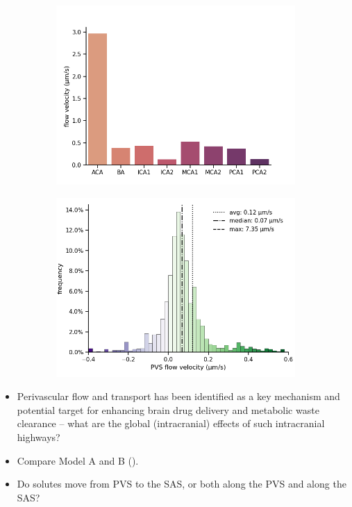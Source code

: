 \documentclass[fleqn,10pt]{wlscirep}
\begin{document}
\begin{figure}
\begin{subfigure}[b]{0.33\textwidth}
    \includegraphics[width =  \linewidth]{figures/arteries_labels_velocity.png}
    \end{subfigure}
    \begin{subfigure}[b]{0.33\textwidth}
    \centering
    \includegraphics[width =  \linewidth]{figures/velocity_histo.png}
    \end{subfigure}
    \label{fig:enter-label}
\end{figure}

\begin{itemize}
\item
  Perivascular flow and transport has been identified as a key
  mechanism and potential target for enhancing brain drug delivery and
  metabolic waste clearance -- what are the global (intracranial)
  effects of such intracranial highways? 
\item
  Compare Model A and B ().
\item
  Do solutes move from PVS to the SAS, or both along the PVS and along the SAS?
\end{itemize}
\end{document}
